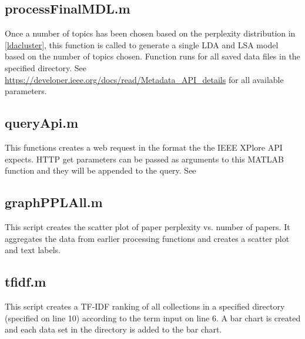 \documentclass{article}
\begin{document}


\subsection{processFinalMDL.m}

Once a number of topics has been chosen based on the perplexity distribution in \ref{ldacluster}, this function is called to generate a single LDA and LSA model based on the number of topics chosen. Function runs for all saved data files in the specified directory. See \url{https://developer.ieee.org/docs/read/Metadata_API_details} for all available parameters.



\subsection{queryApi.m}
\label{queryapi}

This functions creates a web request in the format the the IEEE XPlore API expects. HTTP get parameters can be passed as arguments to this MATLAB function and they will be appended to the query. See 



\subsection{graphPPLAll.m}

This script creates the scatter plot of paper perplexity vs. number of papers. It aggregates the data from earlier processing functions and creates a scatter plot and text labels.



\subsection{tfidf.m}
\label{tfidf}

This script creates a TF-IDF ranking of all collections in a specified directory (specified on line 10) according to the term input on line 6. A bar chart is created and each data set in the directory is added to the bar chart.
\end{document}
